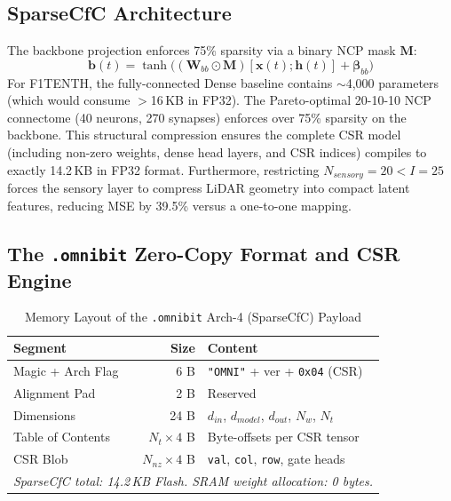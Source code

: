 \documentclass[lettersize,journal]{IEEEtran}
\begin{document}
\subsection{SparseCfC Architecture}
The backbone projection enforces 75\% sparsity via a binary NCP mask $\mathbf{M}$:
\begin{equation}
\mathbf{b}(t) = \tanh\big((\mathbf{W}_{bb}\odot\mathbf{M})[\mathbf{x}(t);\mathbf{h}(t)] + \boldsymbol{\beta}_{bb}\big)
\end{equation}
For F1TENTH, the fully-connected Dense baseline contains $\sim$4,000 parameters (which would consume $>$16\,KB in FP32). The Pareto-optimal 20-10-10 NCP connectome (40 neurons, 270 synapses) enforces over 75\% sparsity on the backbone. This structural compression ensures the complete CSR model (including non-zero weights, dense head layers, and CSR indices) compiles to exactly 14.2\,KB in FP32 format. Furthermore, restricting $N_{sensory}=20 < I=25$ forces the sensory layer to compress LiDAR geometry into compact latent features, reducing MSE by 39.5\% versus a one-to-one mapping.

\subsection{The \texttt{.omnibit} Zero-Copy Format and CSR Engine}

\begin{table}[!t]
\caption{Memory Layout of the \texttt{.omnibit} Arch-4 (SparseCfC) Payload}
\label{tab:omnibit}
\centering
\footnotesize
\begin{tabular}{@{}l r p{3.6cm}@{}}
\toprule
\textbf{Segment} & \textbf{Size} & \textbf{Content} \\
\midrule
Magic + Arch Flag & 6 B & \texttt{"OMNI"} + ver + \texttt{0x04} (CSR) \\
Alignment Pad & 2 B & Reserved \\
Dimensions & 24 B & $d_{in}$, $d_{model}$, $d_{out}$, $N_w$, $N_t$ \\
Table of Contents & $N_t{\times}4$ B & Byte-offsets per CSR tensor \\
CSR Blob & $N_{nz}{\times}4$ B & \texttt{val}, \texttt{col}, \texttt{row}, gate heads \\
\bottomrule
\multicolumn{3}{l}{\footnotesize\textit{SparseCfC total: 14.2\,KB Flash. SRAM weight allocation: 0 bytes.}}
\end{tabular}
\end{table}
\end{document}
